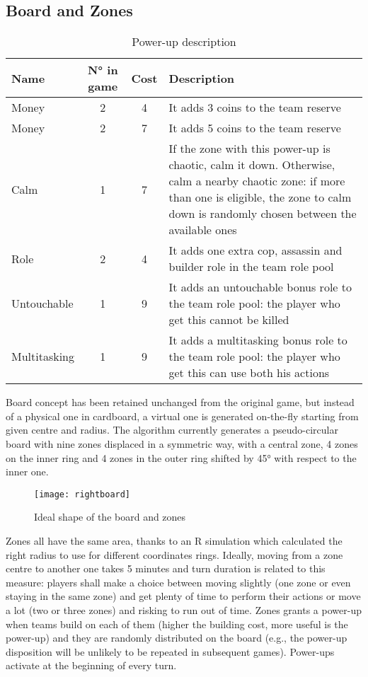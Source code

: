 		\newpage
		
		\subsection{Board and Zones}\label{design:board}
		
			\begin{table}[htp]
				\caption{Power-up description}
				\label{powup:desc}
				\centering
				\begin{tabular}{lccp{}}
					\toprule
					Name 			& N° in game& Cost 	& Description \\
					\midrule
					Money 			& 2 		& 4 	& It adds 3 coins to the team reserve \\
					Money 			& 2 		& 7 	& It adds 5 coins to the team reserve \\
					Calm 			& 1 		& 7 	& If the zone with this power-up is chaotic, calm it down. Otherwise, calm a nearby chaotic zone: if more than one is eligible, the zone to calm down is randomly chosen between the available ones \\
					Role 			& 2 		& 4 	& It adds one extra cop, assassin and builder role in the team role pool \\
					Untouchable 	& 1 		& 9 	& It adds an untouchable bonus role to the team role pool: the player who get this cannot be killed \\
					Multitasking 	& 1 		& 9 	& It adds a multitasking bonus role to the team role pool: the player who get this can use both his actions \\
					\bottomrule
				\end{tabular}
			\end{table}
		
			Board concept has been retained unchanged from the original game, but instead of a physical one in cardboard, a virtual one is generated on-the-fly starting from given centre and radius.
			The algorithm currently generates a pseudo-circular board with nine zones displaced in a symmetric way, with a central zone, 4 zones on the inner ring and 4 zones in the outer ring shifted by 45° with respect to the inner one.
			
			\begin{figure}
				\centering
				\texttt{[image: rightboard]}
				\caption{Ideal shape of the board and zones}
			\end{figure}
			
			Zones all have the same area, thanks to an R simulation which calculated the right radius to use for different coordinates rings.
			Ideally, moving from a zone centre to another one takes 5 minutes and turn duration is related to this measure: players shall make a choice between moving slightly (one zone or even staying in the same zone) and get plenty of time to perform their actions or move a lot (two or three zones) and risking to run out of time.
			Zones grants a power-up when teams build on each of them (higher the building cost, more useful is the power-up) and they are randomly distributed on the board (e.g., the power-up disposition will be unlikely to be repeated in subsequent games).
			Power-ups activate at the beginning of every turn.
			
